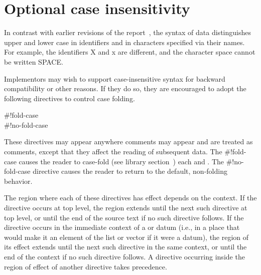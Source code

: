 \chapter{Optional case insensitivity}
\label{caseinsensitivityappendix}

In contrast with earlier revisions of the report~\cite{R5RS}, the
syntax of data distinguishes upper and lower case in identifiers and in
characters specified via their names.  For example, the identifiers
{\cf X} and {\cf x} are different, and the character
{\cf\sharpsign\backwhack{}space} cannot be written
{\cf\sharpsign\backwhack{}SPACE}.

Implementors may wish to support case-insensitive syntax for backward
compatibility or other reasons.
If they do so, they are encouraged to adopt the following directives
to control case folding.

\begin{entry}{%
{\cf{}\#!fold-case}\\
{\cf{}\#!no-fold-case}}

These directives may appear anywhere comments may appear and are
treated as comments, except that they affect the reading of subsequent
data.
The {\cf{}\#!fold-case} causes the reader to case-fold
(see library section~)
each  and .
The {\cf{}\#!no-fold-case} directive causes the reader to return
to the default, non-folding behavior.

The region where each of these directives has effect depends on the
context. If the directive occurs at top level, the region extends
until the next such directive at top level, or until the end of the
source text if no such directive follows.  If the directive occurs in
the immediate context of a  or  datum (i.e.,
in a place that would make it an element of the list or vector if it
were a datum), the region of its effect extends until the next such
directive in the same context, or until the end of the context if no
such directive follows. A directive occurring inside the region of
effect of another directive takes precedence.
\end{entry}

